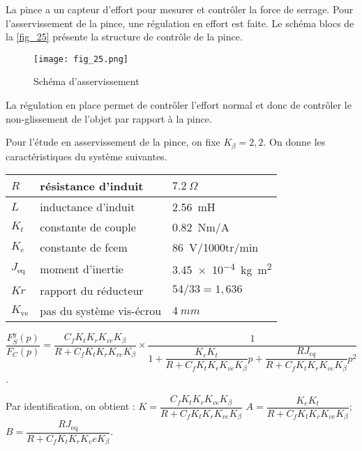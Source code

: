 \ifprof
\else
La pince a un capteur d'effort pour mesurer et contrôler la force de serrage. Pour l'asservissement
de la pince, une régulation en effort est faite. Le schéma blocs de la \autoref{fig_25} présente la structure
de contrôle de la pince.


\begin{figure}[H]
\centering
\texttt{[image: fig\_25.png]}
\caption{Schéma d'asservissement \label{fig_25}}
\end{figure}

\fi

\ifprof
\begin{corrige}
La régulation en place permet de contrôler l’effort normal et donc de contrôler le non-glissement de l’objet par rapport à la pince.
\end{corrige}
\else
\fi
Pour l’étude en asservissement de la pince, on fixe $K_{\beta} = 2,2$.
On donne les caractéristiques du système suivantes.

\ifprof
\else
\begin{table}[H]
\centering
\begin{tabular}{lll}
\hline
$R$ &  résistance d'induit 		& $\SI{7,2}{\Omega}$ \\ \hline
$L$ &   inductance d'induit 	& \SI{2,56}{mH} \\ \hline
$K_t$ &  constante de couple 	& \SI{0,82}{Nm/A} \\ \hline
$K_e$ &  constante de fcem 	& \SI{86}{V/1000tr/min} \\ \hline
$J_{\text{eq}}$ &  moment d'inertie 	& \SI{3,45e-4}{ kg m^2} \\ \hline
$Kr$ &  rapport du réducteur 	& $54/33=1,636$ \\ \hline
$K_{\text{ve}}$ & pas du système vis-écrou & $\SI{4}{mm}$  \\ \hline
\end{tabular}
\end{table}
\fi


\ifprof
\begin{corrige}

$\dfrac{F_S^y (p)}{F_C (p)}=\dfrac{C_f K_t K_r K_{ve} K_{\beta}}{R+C_f K_t K_r K_{ve} K_{\beta} } \times \dfrac{1}{1+\dfrac{K_e K_t}{R+C_f K_t K_r K_{ve} K_{\beta} }p+\dfrac{RJ_{eq}}{R+C_f K_t K_r K_{ve} K_{\beta} } p^2}$.


Par identification, on obtient :
$K=\dfrac{C_f K_t K_r K_{ve} K_{\beta}}{R+C_f K_t K_r K_{ve} K_{\beta}}$
$A=\dfrac{K_e K_t}{R+C_f K_t K_r K_{ve} K_{\beta} }$;
$B=\dfrac{RJ_{\text{eq}}}{R+C_f K_t K_r K_ve K_{\beta} }$.

\end{corrige}
\else
\fi

